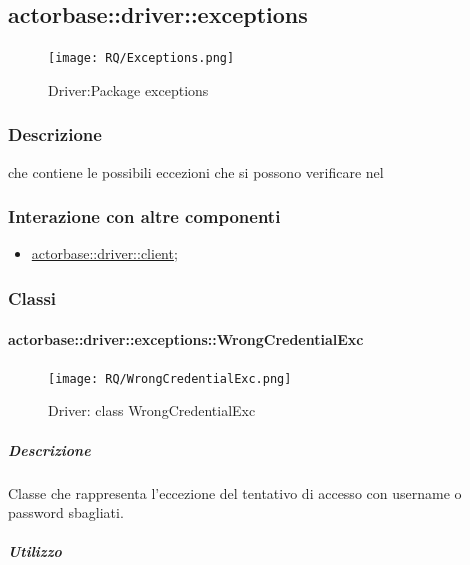 \documentclass{scalatekids-article}
\begin{document}

\subsection{actorbase::driver::exceptions}
\label{sec:actorbase::driver::exceptions}

\begin{figure}[H]
  \begin{center}
    \texttt{[image: RQ/Exceptions.png]}
    \caption{Driver:Package exceptions}
  \end{center}
\end{figure}

\subsubsection{Descrizione}

 che contiene le possibili eccezioni che si possono verificare nel 

\subsubsection{Interazione con altre componenti}
\begin{itemize}
\item \hyperref[sec:actorbase::driver::client]{actorbase::driver::client};
\end{itemize}

\subsubsection{Classi}

\paragraph{actorbase::driver::exceptions::WrongCredentialExc}

\begin{figure}[H]
  \begin{center}
    \texttt{[image: RQ/WrongCredentialExc.png]}
    \caption{Driver: class WrongCredentialExc}
  \end{center}
\end{figure}

\subparagraph{Descrizione}

Classe che rappresenta l'eccezione del tentativo di accesso con username o password sbagliati.

\subparagraph{Utilizzo}
\end{document}
